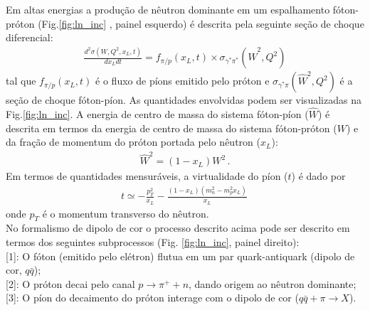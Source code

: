 \documentclass[a4paper,12pt]{article} %
\newcommand{\qq}{{q\bar q}}
\begin{document}
Em altas energias a produção de nêutron dominante em um espalhamento
fóton-próton (Fig.\ref{fig:ln_inc} , painel esquerdo) é descrita pela
seguinte seção de choque diferencial:
\begin{eqnarray}
  \frac{d^2\sigma(W, Q^2, x_L, t)}{dx_Ldt} = 
  f_{\pi/p}(x_L, t) \times \sigma_{\gamma^*\pi^*}(\hat{W}^2, Q^2)
\end{eqnarray}
tal que $f_{\pi/p}(x_L, t)$ é o fluxo de píons emitido pelo próton
e $\sigma_{\gamma^*\pi}(\hat{W}^2, Q^2)$ é a seção de choque
fóton-píon. 
As quantidades envolvidas podem ser visualizadas na Fig.\ref{fig:ln_inc}.
A energia de centro de massa do sistema fóton-píon ($\hat W$)
é descrita em termos da energia de centro de massa do sistema fóton-próton ($W$)
e da fração de momentum do próton portada pelo nêutron ($x_L$):
\begin{eqnarray}
  \hat W^2 = (1-x_L)W^2\,.
\end{eqnarray}
Em termos de quantidades mensuráveis, a virtualidade do píon ($t$)
é dado por
\begin{eqnarray}
  t \simeq -\frac{p_T^2}{x_L} - \frac{(1-x_L)(m_n^2 - m_p^2x_L)}{x_L}\,
\end{eqnarray}
onde $p_T$ é o momentum transverso do nêutron.\\
\indent No formalismo de dipolo de cor o processo descrito acima
pode ser descrito em termos dos seguintes subprocessos
(Fig. \ref{fig:ln_inc}, painel direito):\\
\hspace*{1cm} [1]: O fóton (emitido pelo elétron) flutua em um par quark-antiquark (dipolo de cor, $\qq$);\\
\hspace*{1cm} [2]: O próton decai pelo canal $p\rightarrow \pi^{+}+n$, dando origem ao nêutron dominante;\\
\hspace*{1cm} [3]: O píon do decaimento do próton interage com o dipolo de cor ($\qq + \pi \rightarrow X$).\\
\end{document}
